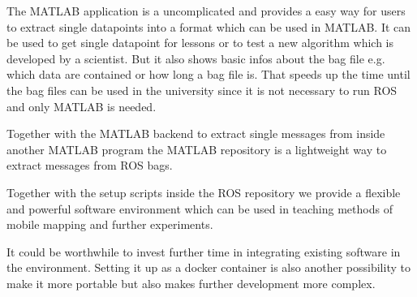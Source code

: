 The MATLAB application is a uncomplicated and provides a easy way for users to extract single datapoints into a format which can be used in MATLAB.
It can be used to get single datapoint for lessons or to test a new algorithm which is developed by a scientist.
But it also shows basic infos about the bag file e.g. which data are contained or how long a bag file is.
That speeds up the time until the bag files can be used in the university since it is not necessary to run ROS and only MATLAB is needed.

Together with the MATLAB backend to extract single messages from inside another MATLAB program the MATLAB repository is a lightweight way to extract messages from ROS bags.

Together with the setup scripts inside the ROS repository we provide a flexible and powerful software environment which can be used in teaching methods of mobile mapping and further experiments.

It could be worthwhile to invest further time in integrating existing software in the environment.
Setting it up as a docker container is also another possibility to make it more portable but also makes further development more complex.

